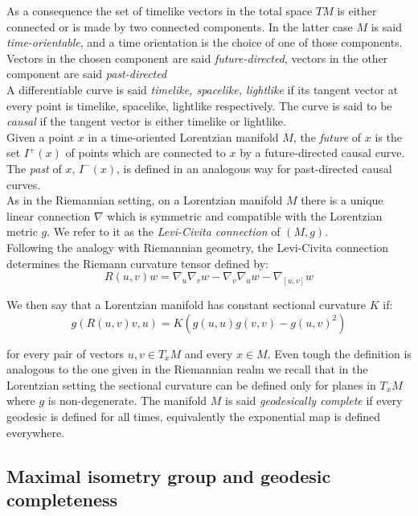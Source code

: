 As a consequence the set of timelike vectors in the total space $TM$ is either connected or is made by two connected components. In the latter case $M$ is said \textit{time-orientable}, and a time orientation is the choice of one of those components. Vectors in the chosen component are said \textit{future-directed}, vectors in the other component are said \textit{past-directed}\\
A differentiable curve is said \textit{timelike, spacelike, lightlike} if its tangent vector at every point is timelike, spacelike, lightlike respectively. The curve is said to be \textit{causal} if the tangent vector is either timelike or lightlike. \\ Given a point $x$ in a time-oriented Lorentzian manifold $M$, the \textit{future} of $x$ is the set $I^+(x)$ of points which are connected to $x$ by a future-directed causal curve. The \textit{past} of $x$, $I^-(x)$, is defined in an analogous way for past-directed causal curves. \\As in the Riemannian setting, on a Lorentzian manifold $M$ there is a unique linear connection $\nabla$ which is symmetric and compatible with the Lorentzian metric $g$. We refer to it as the \textit{Levi-Civita connection} of $(M,g)$.\\ Following the analogy with Riemannian geometry, the Levi-Civita connection determines the Riemann curvature tensor defined by: 
\[
    R(u,v)w=\nabla_u\nabla_v w-\nabla_v\nabla_u w-\nabla_{[u,v]}w
\]  

We then say that a Lorentzian manifold has constant sectional curvature $K$ if: 
\begin{equation}\label{sectionalcurvature}
    g(R(u,v)v,u)=K(g(u,u)g(v,v)-g(u,v)^2) 
\end{equation}
    


for every pair of vectors $u,v \in T_{x}M$ and every $x\in M$. Even tough the definition is analogous to the one given in the Riemannian realm we recall that in the Lorentzian setting the sectional curvature can be defined only for planes in $T_{x}M$ where $g$ is non-degenerate. The manifold $M$ is said \textit{geodesically complete} if every geodesic is defined for all times, equivalently the exponential map is defined everywhere.\\

\subsection{Maximal isometry group and geodesic completeness} 

